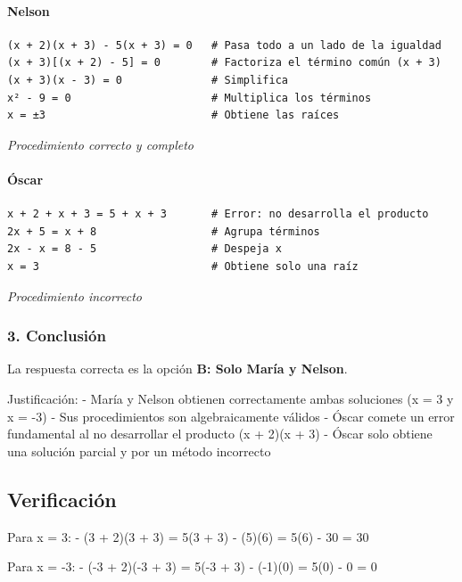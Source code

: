 \documentclass[
]{article}
\begin{document}
\paragraph{Nelson}\label{nelson}

\begin{verbatim}
(x + 2)(x + 3) - 5(x + 3) = 0   # Pasa todo a un lado de la igualdad
(x + 3)[(x + 2) - 5] = 0        # Factoriza el término común (x + 3)
(x + 3)(x - 3) = 0              # Simplifica
x² - 9 = 0                      # Multiplica los términos
x = ±3                          # Obtiene las raíces
\end{verbatim}

\emph{Procedimiento correcto y completo}

\paragraph{Óscar}\label{uxf3scar}

\begin{verbatim}
x + 2 + x + 3 = 5 + x + 3       # Error: no desarrolla el producto
2x + 5 = x + 8                  # Agrupa términos
2x - x = 8 - 5                  # Despeja x
x = 3                           # Obtiene solo una raíz
\end{verbatim}

\emph{Procedimiento incorrecto}

\subsubsection{3. Conclusión}\label{conclusiuxf3n-4}

La respuesta correcta es la opción \textbf{B: Solo María y Nelson}.

Justificación: - María y Nelson obtienen correctamente ambas soluciones
(x = 3 y x = -3) - Sus procedimientos son algebraicamente válidos -
Óscar comete un error fundamental al no desarrollar el producto (x +
2)(x + 3) - Óscar solo obtiene una solución parcial y por un método
incorrecto

\subsection{Verificación}\label{verificaciuxf3n}

Para x = 3: - (3 + 2)(3 + 3) = 5(3 + 3) - (5)(6) = 5(6) - 30 = 30
\checkmark

Para x = -3: - (-3 + 2)(-3 + 3) = 5(-3 + 3) - (-1)(0) = 5(0) - 0 = 0
\checkmark
\end{document}
